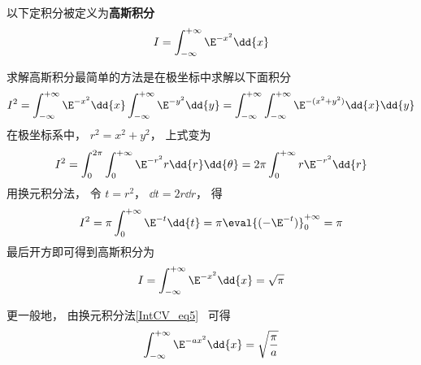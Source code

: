 

以下定积分被定义为\textbf{高斯积分}
\begin{equation}
I = \int_{-\infty}^{+\infty} \E^{-x^2}\dd{x}
\end{equation}

求解高斯积分最简单的方法是在极坐标中求解以下面积分
\begin{equation}
I^2 = \int_{-\infty}^{+\infty} \E^{-x^2}\dd{x} \int_{-\infty}^{+\infty} \E^{-y^2}\dd{y}
=\int_{-\infty}^{+\infty}\int_{-\infty}^{+\infty} \E^{-(x^2 + y^2)} \dd{x}\dd{y}
\end{equation}
在极坐标系中， $r^2 = x^2 + y^2$， 上式变为
\begin{equation}
I^2 = \int_0^{2\pi} \int_0^{+\infty} \E^{-r^2} r\dd{r}\dd{\theta}
= 2\pi \int_0^{+\infty} r\E^{-r^2} \dd{r}
\end{equation}
用换元积分法， 令 $t = r^2$， $\dd{t} = 2r\dd{r}$， 得
\begin{equation}
I^2 = \pi \int_0^{+\infty} \E^{-t} \dd{t} = \pi \eval{(-\E^{-t})}_0^{+\infty} = \pi
\end{equation}
最后开方即可得到高斯积分为
\begin{equation}
I = \int_{-\infty}^{+\infty} \E^{-x^2}\dd{x} = \sqrt{\pi}
\end{equation}

更一般地， 由换元积分法\autoref{IntCV_eq5}~ 可得
\begin{equation}
\int_{-\infty}^{+\infty} \E^{-a x^2}\dd{x} = \sqrt{\frac{\pi}{a}}
\end{equation}